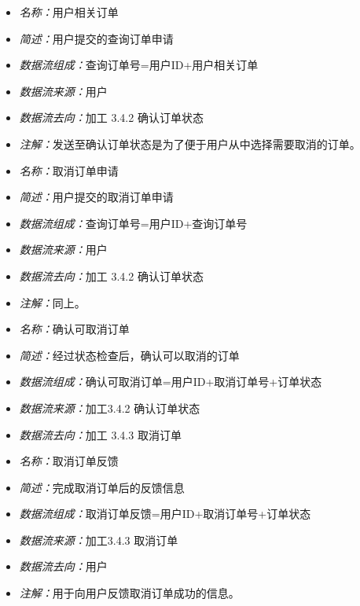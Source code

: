 \vspace{-1mm}

\begin{itemize}
\item \textit{名称：}用户相关订单
	\item \textit{简述：}用户提交的查询订单申请
	\item \textit{数据流组成：}查询订单号=用户ID+用户相关订单
	\item \textit{数据流来源：}用户
	\item \textit{数据流去向：}加工 3.4.2 确认订单状态
	\item \textit{注解：}发送至确认订单状态是为了便于用户从中选择需要取消的订单。
\end{itemize}

\vspace{-1mm}

\begin{itemize}
\item \textit{名称：}取消订单申请
	\item \textit{简述：}用户提交的取消订单申请
	\item \textit{数据流组成：}查询订单号=用户ID+查询订单号
	\item \textit{数据流来源：}用户
	\item \textit{数据流去向：}加工 3.4.2 确认订单状态
	\item \textit{注解：}同上。
\end{itemize}

\vspace{-1mm}

\begin{itemize}
\item \textit{名称：}确认可取消订单
	\item \textit{简述：}经过状态检查后，确认可以取消的订单
	\item \textit{数据流组成：}确认可取消订单=用户ID+取消订单号+订单状态
	\item \textit{数据流来源：}加工3.4.2 确认订单状态
	\item \textit{数据流去向：}加工 3.4.3 取消订单
\end{itemize}

\vspace{-1mm}

\begin{itemize}
\item \textit{名称：}取消订单反馈
	\item \textit{简述：}完成取消订单后的反馈信息
	\item \textit{数据流组成：}取消订单反馈=用户ID+取消订单号+订单状态
	\item \textit{数据流来源：}加工3.4.3 取消订单
	\item \textit{数据流去向：}用户
	\item \textit{注解：}用于向用户反馈取消订单成功的信息。
\end{itemize}

